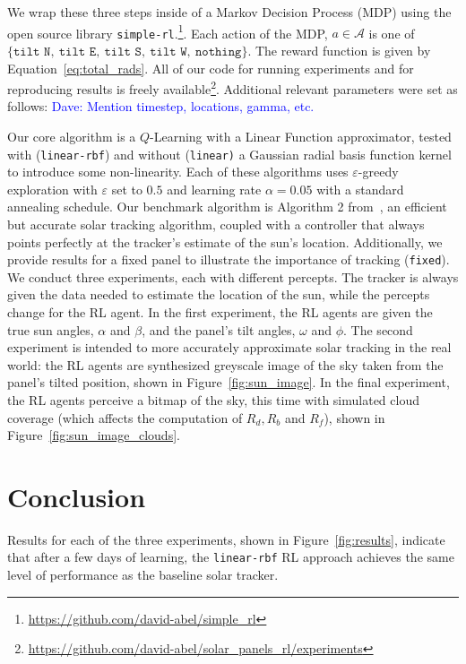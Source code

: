 \documentclass[11pt]{article}
\newcommand{\dnote}[1]{\textcolor{blue}{Dave: #1}}
\newcommand{\mc}{\mathcal}
\begin{document}
We wrap these three steps inside of a Markov Decision Process (MDP) using the open source library \texttt{simple-rl}.\footnote{\url{https://github.com/david-abel/simple_rl}}. Each action of the MDP, $a \in \mc{A}$ is one of $\{\texttt{tilt N},\ \texttt{tilt E},\ \texttt{tilt S},\ \texttt{tilt W},\ \texttt{nothing}\}$. The reward function is given by Equation~\ref{eq:total_rads}. All of our code for running experiments and for reproducing results is freely available\footnote{\url{https://github.com/david-abel/solar_panels_rl/experiments}}. Additional relevant parameters were set as follows: \dnote{Mention timestep, locations, gamma, etc.} %

Our core algorithm is a $Q$-Learning with a Linear Function approximator, tested with (\texttt{linear-rbf}) and without (\texttt{linear)} a Gaussian radial basis function kernel to introduce some non-linearity. Each of these algorithms uses $\varepsilon$-greedy exploration with $\varepsilon$ set to $0.5$ and learning rate $\alpha = 0.05$ with a standard annealing schedule. Our benchmark algorithm is Algorithm 2 from~\citet{Grena2012}, an efficient but accurate solar tracking algorithm, coupled with a controller that always points perfectly at the tracker's estimate of the sun's location. Additionally, we provide results for a fixed panel to illustrate the importance of tracking (\texttt{fixed}). We conduct three experiments, each with different percepts. The tracker is always given the data needed to estimate the location of the sun, while the percepts change for the RL agent. In the first experiment, the RL agents are given the true sun angles, $\alpha$ and $\beta$, and the panel's tilt angles, $\omega$ and $\phi$. The second experiment is intended to more accurately approximate solar tracking in the real world: the RL agents are synthesized greyscale image of the sky taken from the panel's tilted position, shown in Figure~\ref{fig:sun_image}. In the final experiment, the RL agents perceive a bitmap of the sky, this time with simulated cloud coverage (which affects the computation of $R_d, R_b$ and $R_f$), shown in Figure~\ref{fig:sun_image_clouds}.

\section{Conclusion}
Results for each of the three experiments, shown in Figure~\ref{fig:results}, indicate that after a few days of learning, the \texttt{linear-rbf} RL approach achieves the same level of performance as the baseline solar tracker.
\end{document}
